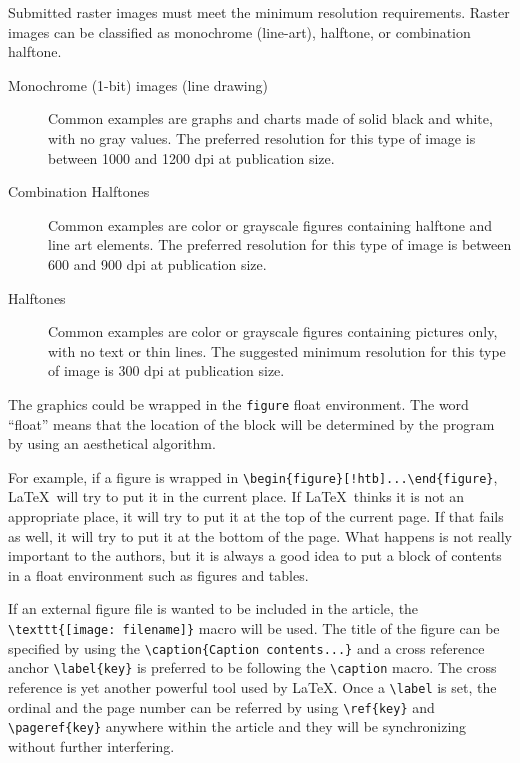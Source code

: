 \documentclass[submitting]{nst}
\begin{document}
Submitted raster images must meet the minimum resolution requirements. Raster images can be classified as monochrome (line-art), halftone, or combination halftone.
\begin{description}

\item[Monochrome (1-bit) images (line drawing)] Common examples are graphs and charts made of solid black and white, with no gray values. The preferred resolution for this type of image is between 1000 and 1200 dpi at publication size.
\item[Combination Halftones] Common examples are color or grayscale figures containing halftone and line art elements. The preferred resolution for this type of image is between 600 and 900 dpi at publication size.
\item[Halftones] Common examples are color or grayscale figures containing pictures only, with no text or thin lines. The suggested minimum resolution for this type of image is 300 dpi at publication size.
\end{description}

The graphics could be wrapped in the \texttt{figure} float environment. The word ``float'' means that the location of the block will be determined by the program by using an aesthetical algorithm. 

For example, if a figure is wrapped in \verb|\begin{figure}[!htb]...\end{figure}|, \LaTeX\ will try to put it in the current place. If \LaTeX\ thinks it is not an appropriate place, it will try to put it at the top of the current page. If that fails as well, it will try to put it at the bottom of the page. What happens is not really important to the authors, but it is always a good idea to put a block of contents in a float environment such as figures and tables.

If an external figure file is wanted to be included in the article, the \verb|\texttt{[image: filename]}| macro will be used. The title of the figure can be specified by using the \verb|\caption{Caption contents...}| and a cross reference anchor \verb|\label{key}| is preferred to be following the \verb|\caption| macro. The cross reference is yet another powerful tool used by \LaTeX. Once a \verb|\label| is set, the ordinal and the page number can be referred by using \verb|\ref{key}| and \verb|\pageref{key}| anywhere within the article and they will be synchronizing without further interfering.
\end{document}
